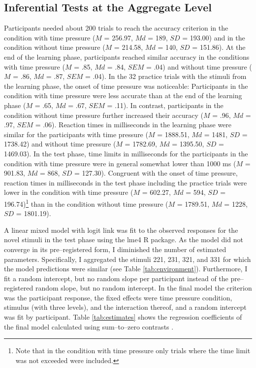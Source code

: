 \documentclass[a4paper,man,natbib]{apa6}
\begin{document}
\subsection{Inferential Tests at the Aggregate Level}
Participants needed about 200 trials to reach the accuracy criterion in the condition with time pressure ($M$ = 256.97, $Md$ = 189, $SD$ = 193.00) and in the condition without time pressure ($M$ = 214.58, $Md$ = 140, $SD$ = 151.86). At the end of the learning phase, participants reached similar accuracy in the conditions with time pressure ($M$ = .85, $Md$ = .84, $SEM$ = .04) and without time pressure ($M$ = .86, $Md$ = .87, $SEM$ = .04). In the 32 practice trials with the stimuli from the learning phase, the onset of time pressure was noticeable: Participants in the condition with time pressure were less accurate than at the end of the learning phase ($M$ = .65, $Md$ = .67, $SEM$ = .11). In contrast, participants in the condition without time pressure further increased their accuracy ($M$ = .96, $Md$ = .97, $SEM$ = .06). Reaction times in milliseconds in the learning phase were similar for the participants with time pressure ($M$ = 1888.51, $Md$ = 1481, $SD$ = 1738.42) and without time pressure ($M$ = 1782.69, $Md$ = 1395.50, $SD$ = 1469.03). In the test phase, time limits in milliseconds for the participants in the condition with time pressure were in general somewhat lower than 1000 ms ($M$ = 901.83, $Md$ = 868, $SD$ = 127.30). Congruent with the onset of time pressure, reaction times in milliseconds in the test phase including the practice trials were lower in the condition with time pressure ($M$ = 602.27, $Md$ = 594, $SD$ = 196.74)\footnote{Note that in the condition with time pressure only trials where the time limit was not exceeded were included.} than in the condition without time pressure ($M$ = 1789.51, $Md$ = 1228, $SD$ = 1801.19). 

A linear mixed model with logit link was fit to the observed responses for the novel stimuli in the test phase using the lme4 R package. As the model did not converge in its pre--registered form, I diminished the number of estimated parameters. Specifically, I aggregated the stimuli 221, 231, 321, and 331 for which the model predictions were similar (see Table \ref{tab:environment}). Furthermore, I fit a random intercept, but no random slope per participant instead of the pre--registered random slope, but no random intercept. In the final model the criterion was the participant response, the fixed effects were time pressure condition, stimulus (with three levels), and the interaction thereof, and a random intercept was fit by participant. Table \ref{tab:estimates} shows the regression coefficients of the final model calculated using sum--to--zero contrasts \citep{singmann2017introduction}. 
\end{document}
